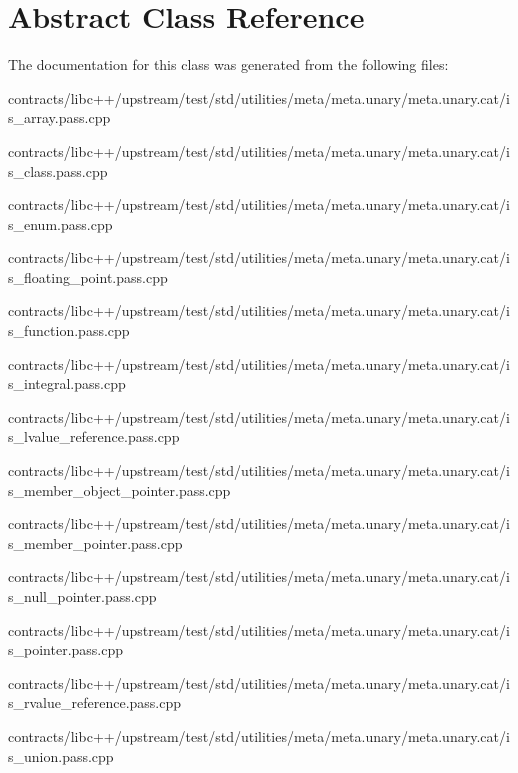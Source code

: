 \hypertarget{class_abstract}{}\section{Abstract Class Reference}
\label{class_abstract}


The documentation for this class was generated from the following files\+:\begin{DoxyCompactItemize}
\item 
contracts/libc++/upstream/test/std/utilities/meta/meta.\+unary/meta.\+unary.\+cat/is\+\_\+array.\+pass.\+cpp\item 
contracts/libc++/upstream/test/std/utilities/meta/meta.\+unary/meta.\+unary.\+cat/is\+\_\+class.\+pass.\+cpp\item 
contracts/libc++/upstream/test/std/utilities/meta/meta.\+unary/meta.\+unary.\+cat/is\+\_\+enum.\+pass.\+cpp\item 
contracts/libc++/upstream/test/std/utilities/meta/meta.\+unary/meta.\+unary.\+cat/is\+\_\+floating\+\_\+point.\+pass.\+cpp\item 
contracts/libc++/upstream/test/std/utilities/meta/meta.\+unary/meta.\+unary.\+cat/is\+\_\+function.\+pass.\+cpp\item 
contracts/libc++/upstream/test/std/utilities/meta/meta.\+unary/meta.\+unary.\+cat/is\+\_\+integral.\+pass.\+cpp\item 
contracts/libc++/upstream/test/std/utilities/meta/meta.\+unary/meta.\+unary.\+cat/is\+\_\+lvalue\+\_\+reference.\+pass.\+cpp\item 
contracts/libc++/upstream/test/std/utilities/meta/meta.\+unary/meta.\+unary.\+cat/is\+\_\+member\+\_\+object\+\_\+pointer.\+pass.\+cpp\item 
contracts/libc++/upstream/test/std/utilities/meta/meta.\+unary/meta.\+unary.\+cat/is\+\_\+member\+\_\+pointer.\+pass.\+cpp\item 
contracts/libc++/upstream/test/std/utilities/meta/meta.\+unary/meta.\+unary.\+cat/is\+\_\+null\+\_\+pointer.\+pass.\+cpp\item 
contracts/libc++/upstream/test/std/utilities/meta/meta.\+unary/meta.\+unary.\+cat/is\+\_\+pointer.\+pass.\+cpp\item 
contracts/libc++/upstream/test/std/utilities/meta/meta.\+unary/meta.\+unary.\+cat/is\+\_\+rvalue\+\_\+reference.\+pass.\+cpp\item 
contracts/libc++/upstream/test/std/utilities/meta/meta.\+unary/meta.\+unary.\+cat/is\+\_\+union.\+pass.\+cpp\item 

\end{DoxyCompactItemize}
